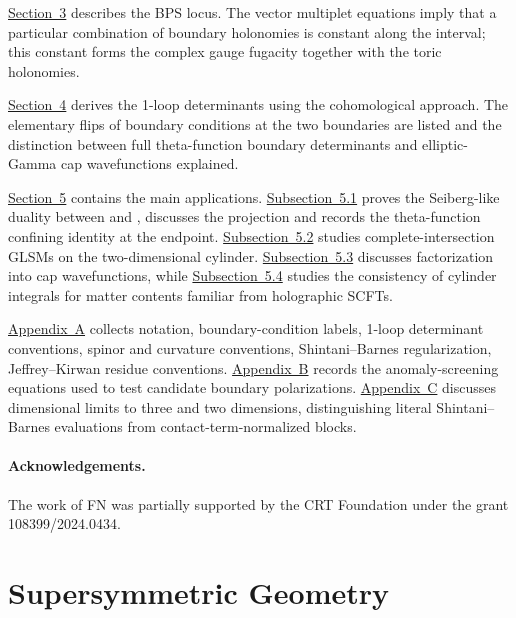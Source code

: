 \documentclass[11pt,a4paper]{article}
\makeatletter
\numberwithin{equation}{section}
\theoremstyle{plain}
\theoremstyle{definition}
\theoremstyle{remark}
\newcounter{mathrecordid}
\newcommand{\mathboxbegin}[1]{%
  \stepcounter{mathrecordid}%
  \immediate\write\mathrecords{\themathrecordid,#1}%
  \special{pdf:bann << /Type /Annot /Subtype /Link /Border [0 0 0]
    /MathBoxID \themathrecordid /F 2
    /A << /S /URI /URI (urn:mathbox:\themathrecordid) >> >>}}
\newcommand{\mathboxinlineplain}[1]{$#1$}
\newcommand{\mathboxinline}[1]{%
  $\mathboxbegin{inline}#1\special{pdf:eann}$}
\newcommand{\recordmath}{%
  \ifmeasuring@\expandafter\mathboxinlineplain
  \else\expandafter\mathboxinline\fi}
\makeatother
\begin{document}
\hyperref[sec:bps-loci]{Section~3} describes the BPS locus. The vector multiplet equations imply that a particular combination of boundary holonomies is constant along the interval; this constant forms the complex gauge fugacity together with the toric holonomies.

\hyperref[sec:oneloop]{Section~4} derives the 1-loop determinants using the cohomological approach.  The elementary flips of boundary conditions  at the two boundaries  are listed and the distinction between full theta-function boundary determinants and elliptic-Gamma cap wavefunctions explained.

\hyperref[sec:applications-examples]{Section~5} contains the main applications.  \hyperref[sec:duality]{Subsection~5.1} proves the Seiberg-like duality between \recordmath{U(N_c)} and \recordmath{U(N_f-N_c)}, discusses the \recordmath{SU} projection and records the theta-function confining identity at the \recordmath{U(0)} endpoint.  \hyperref[sec:complete-intersections-cylinder]{Subsection~5.2} studies complete-intersection GLSMs on the two-dimensional cylinder.  \hyperref[sec:factorization-half-blocks]{Subsection~5.3} discusses factorization into cap wavefunctions, while \hyperref[sec:holographic-benchmarks]{Subsection~5.4} studies the consistency of cylinder integrals for matter contents familiar from holographic SCFTs.

\hyperref[app:notation-conventions]{Appendix~A} collects notation, boundary-condition labels, 1-loop determinant conventions, spinor and curvature conventions, Shintani--Barnes regularization, Jeffrey--Kirwan residue conventions.  \hyperref[app:anomalies]{Appendix~B} records the anomaly-screening equations used to test candidate boundary polarizations.  \hyperref[app:dimensional-limits]{Appendix~C} discusses dimensional limits to three and two dimensions, distinguishing literal Shintani--Barnes evaluations from contact-term-normalized blocks.


\paragraph{Acknowledgements.}

The work of FN was partially supported by the CRT Foundation under the grant 108399/2024.0434.


\section{Supersymmetric Geometry}\label{sec:geometry-loc}
\end{document}
